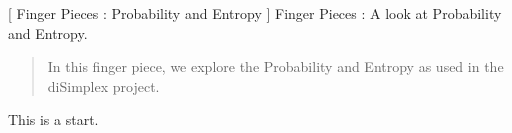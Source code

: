 
[
  Finger Pieces : Probability and Entropy
]{
  Finger Pieces : A look at Probability and Entropy.
}
\author{Stephen Gaito}

\maketitle

\begin{abstract}
  In this finger piece, we explore the Probability and Entropy as used in the
  diSimplex project.
\end{abstract}

This is a start.
